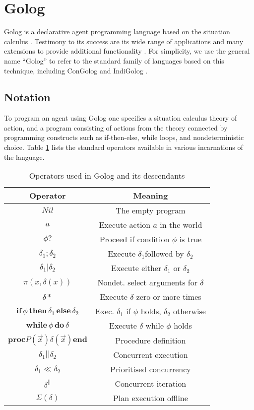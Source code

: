 \section{Golog\label{sec:Background:Golog}}

Golog is a declarative agent programming language based on the situation
calculus \citep{levesque97golog}. Testimony to its success are its
wide range of applications and many extensions to provide additional
functionality \citep{giacomo00congolog,giacomo99indigolog,Ferrein2005readylog}.
For simplicity, we use the general name {}``Golog'' to refer to
the standard family of languages based on this technique, including
ConGolog \citep{giacomo00congolog} and IndiGolog \citep{giacomo99indigolog}.


\subsection{Notation}

To program an agent using Golog one specifies a situation calculus
theory of action, and a program consisting of actions from the theory
connected by programming constructs such as if-then-else, while loops,
and nondeterministic choice. Table \ref{tbl:Background:Golog-Operators}
lists the standard operators available in various incarnations of
the language.

%
\begin{table}
\begin{centering}
\begin{tabular}{|c|c|}
\hline 
Operator  & Meaning\tabularnewline
\hline
\hline 
$Nil$  & The empty program\tabularnewline
\hline 
$a$  & Execute action $a$ in the world\tabularnewline
\hline 
$\phi?$  & Proceed if condition $\phi$ is true\tabularnewline
\hline 
$\delta_{1};\delta_{2}$  & Execute $\delta_{1}$followed by $\delta_{2}$\tabularnewline
\hline 
$\delta_{1}|\delta_{2}$  & Execute either $\delta_{1}$ or $\delta_{2}$\tabularnewline
\hline 
$\pi(x,\delta(x))$  & Nondet. select arguments for $\delta$\tabularnewline
\hline 
$\delta*$  & Execute $\delta$ zero or more times\tabularnewline
\hline 
$\mathbf{if}\,\phi\,\mathbf{then}\,\delta_{1}\,\mathbf{else}\,\delta_{2}$  & Exec. $\delta_{1}$ if $\phi$ holds, $\delta_{2}$ otherwise\tabularnewline
\hline 
$\mathbf{while\,}\phi\mathbf{\, do}\,\delta$  & Execute $\delta$ while $\phi$ holds\tabularnewline
\hline 
$\mathbf{proc}P(\overrightarrow{x})\delta(\overrightarrow{x})\mathbf{end}$  & Procedure definition\tabularnewline
\hline 
$\delta_{1}||\delta_{2}$  & Concurrent execution\tabularnewline
\hline 
$\delta_{1}\ll\delta_{2}$  & Prioritised concurrency\tabularnewline
\hline 
$\delta^{||}$  & Concurrent iteration\tabularnewline
\hline 
$\Sigma(\delta)$  & Plan execution offline\tabularnewline
\hline
\end{tabular}
\par\end{centering}

\caption{Operators used in Golog and its descendants \label{tbl:Background:Golog-Operators} }

\end{table}



